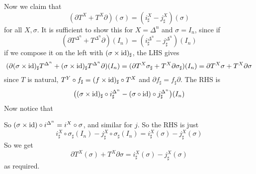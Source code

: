 Now we claim that
$$ (\partial T^X + T^X\partial)(\sigma) = (i^X_\sharp - j^X_\sharp)(\sigma) $$
for all $X,\sigma$.
It is sufficient to show this for $X=\Delta^n$ and $\sigma=I_n$, since if
$$ (\partial T^{\Delta^n} + T^{\Delta^n}\partial)(I_n) = (i^{\Delta^n}_\sharp - j^{\Delta^n}_\sharp)(I_n) $$
if we compose it on the left with $(\sigma\times{\rm id})_\sharp$, the LHS gives
$$ (\partial(\sigma\times{\rm id})_\sharp T^{\Delta^n} + (\sigma\times{\rm id})_\sharp T^{\Delta^n}\partial)(I_n) = (\partial T^X\sigma_\sharp + T^X\partial\sigma_\sharp)(I_n)
= \partial T^X\sigma + T^X\partial\sigma $$
since $T$ is natural, $T^Y\circ f_\sharp=(f\times{\rm id})_\sharp\circ T^X$ and $\partial f_\sharp=f_\sharp\partial$.
The RHS is
$$ \bigl((\sigma\times{\rm id})_\sharp\circ i^{\Delta^n}_\sharp - (\sigma\circ{\rm id})\circ j_\sharp^{\Delta^n}\bigr)(I_n) $$
Now notice that

\centerline{
}

So $(\sigma\times{\rm id})\circ i^{\Delta^n}=i^X\circ\sigma$, and similar for $j$.
So the RHS is just
$$ i^X_\sharp\circ\sigma_\sharp(I_n) - j^X_\sharp\circ\sigma_\sharp(I_n) = i^X_\sharp(\sigma) - j^X_\sharp(\sigma) $$
So we get
$$ \partial T^X(\sigma) + T^X\partial\sigma = i^X_\sharp(\sigma) - j^X_\sharp(\sigma) $$
as required.
